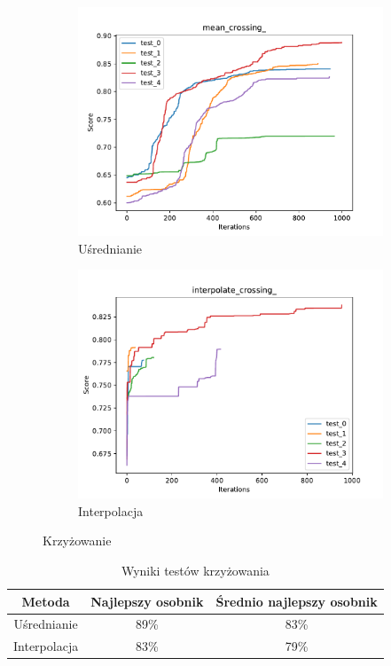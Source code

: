 \begin{figure}[h!]
    \centering 
    \begin{subfigure}[b]{0.49\linewidth}
        \includegraphics[width=\linewidth]{img/mean_crossing_.pdf}
        \caption{Uśrednianie}
    \end{subfigure}
    \begin{subfigure}[b]{0.49\linewidth}
        \includegraphics[width=\linewidth]{img/interpolate_crossing_.pdf}
        \caption{Interpolacja}
    \end{subfigure}
    \caption{Krzyżowanie}
    \label{fig:crossing}
\end{figure}

\begin{table}[H]
    \centering
    \begin{tabular}{|c|c|c|}
    \hline
    Metoda       & Najlepszy osobnik & Średnio najlepszy osobnik \\ \hline
    Uśrednianie  & 89\%              & 83\%                      \\ \hline
    Interpolacja & 83\%              & 79\%                      \\ \hline
    \end{tabular}
    \caption{Wyniki testów krzyżowania}
    \label{tab:crossing}
\end{table}

